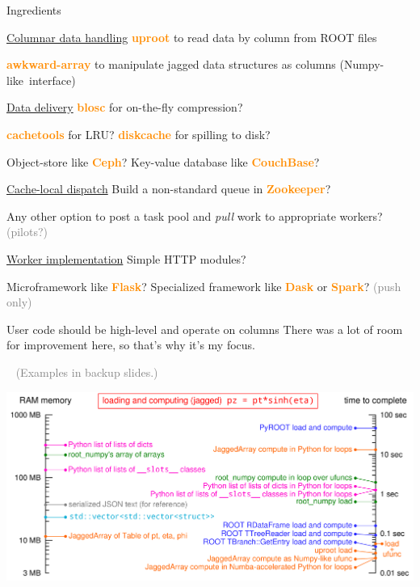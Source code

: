\documentclass[aspectratio=169]{beamer}
\begin{document}
\begin{frame}{Ingredients}
\vspace{0.2 cm}
\begin{block}{\underline{Columnar data handling}}
\textcolor{darkorange}{\bf uproot} to read data by column from ROOT files

\textcolor{darkorange}{\bf awkward-array} to manipulate jagged data structures as columns \mbox{(Numpy-like interface)\hspace{-1 cm}}
\end{block}

\begin{block}{\underline{Data delivery}}
\textcolor{darkorange}{\bf blosc} for on-the-fly compression?

\textcolor{darkorange}{\bf cachetools} for LRU? \textcolor{darkorange}{\bf diskcache} for spilling to disk?

Object-store like \textcolor{darkorange}{\bf Ceph}? Key-value database like \textcolor{darkorange}{\bf CouchBase}?
\end{block}

\begin{block}{\underline{Cache-local dispatch}}
Build a non-standard queue in \textcolor{darkorange}{\bf Zookeeper}?

Any other option to post a task pool and {\it pull} work to appropriate workers? \textcolor{gray}{(pilots?)}
\end{block}

\begin{block}{\underline{Worker implementation}}
Simple HTTP modules?

Microframework like \textcolor{darkorange}{\bf Flask}? Specialized framework like \textcolor{darkorange}{\bf Dask} or \textcolor{darkorange}{\bf Spark}? \textcolor{gray}{(push only)}
\end{block}
\end{frame}

\begin{frame}{User code should be high-level and operate on columns}
\large
\vspace{0.25 cm}
There was a lot of room for improvement here, so that's why it's my focus.

\mbox{ } \hfill \textcolor{gray}{(Examples in backup slides.)} \hfill \mbox{ }

\vspace{0.5 cm}
\begin{center}
\includegraphics[width=0.9\linewidth]{logscales.pdf}
\end{center}
\end{frame}
\end{document}
